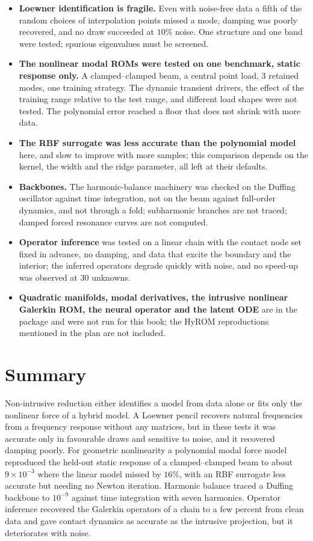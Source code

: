 \begin{limitsbox}
\begin{itemize}
\item \textbf{Loewner identification is fragile.} Even with noise-free data a fifth of the random choices of interpolation points missed a mode, damping was poorly recovered, and no draw succeeded at $10\%$ noise. One structure and one band were tested; spurious eigenvalues must be screened.
\item \textbf{The nonlinear modal ROMs were tested on one benchmark, static response only.} A clamped--clamped beam, a central point load, $3$ retained modes, one training strategy. The dynamic transient drivers, the effect of the training range relative to the test range, and different load shapes were not tested. The polynomial error reached a floor that does not shrink with more data.
\item \textbf{The RBF surrogate was less accurate than the polynomial model} here, and slow to improve with more samples; this comparison depends on the kernel, the width and the ridge parameter, all left at their defaults.
\item \textbf{Backbones.} The harmonic-balance machinery was checked on the Duffing oscillator against time integration, not on the beam against full-order dynamics, and not through a fold; subharmonic branches are not traced; damped forced resonance curves are not computed.
\item \textbf{Operator inference} was tested on a linear chain with the contact node set fixed in advance, no damping, and data that excite the boundary and the interior; the inferred operators degrade quickly with noise, and no speed-up was observed at $30$ unknowns.
\item \textbf{Quadratic manifolds, modal derivatives, the intrusive nonlinear Galerkin ROM, the neural operator and the latent ODE} are in the package and were not run for this book; the HyROM reproductions mentioned in the plan are not included.
\end{itemize}
\end{limitsbox}

\section{Summary}\label{sec:ni-summary}

Non-intrusive reduction either identifies a model from data alone or fits only the nonlinear force of a hybrid model. A Loewner pencil recovers natural frequencies from a frequency response without any matrices, but in these tests it was accurate only in favourable draws and sensitive to noise, and it recovered damping poorly. For geometric nonlinearity a polynomial modal force model reproduced the held-out static response of a clamped--clamped beam to about $9\times10^{-3}$ where the linear model missed by $16\%$, with an RBF surrogate less accurate but needing no Newton iteration. Harmonic balance traced a Duffing backbone to $10^{-9}$ against time integration with seven harmonics. Operator inference recovered the Galerkin operators of a chain to a few percent from clean data and gave contact dynamics as accurate as the intrusive projection, but it deteriorates with noise.

